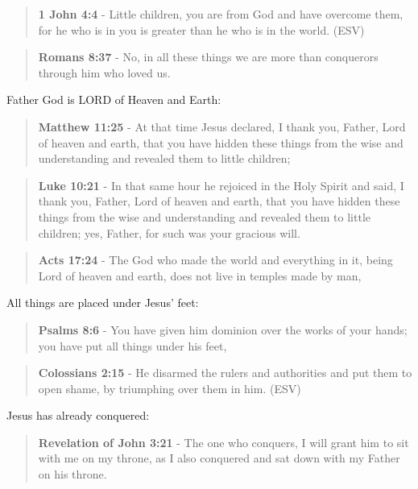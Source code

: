 \documentclass[11pt]{article}
\begin{document}
\begin{quote}
\textbf{1 John 4:4} -  Little children, you are from God and have overcome them, for he who is in you is greater than he who is in the world.  (ESV)
\end{quote}

\begin{quote}
\textbf{Romans 8:37} - No, in all these things we are more than conquerors through him who loved us.
\end{quote}

Father God is LORD of Heaven and Earth:

\begin{quote}
\textbf{Matthew 11:25} - At that time Jesus declared, I thank you, Father, Lord of heaven and earth, that you have hidden these things from the wise and understanding and revealed them to little children;
\end{quote}

\begin{quote}
\textbf{Luke 10:21} - In that same hour he rejoiced in the Holy Spirit and said, I thank you, Father, Lord of heaven and earth, that you have hidden these things from the wise and understanding and revealed them to little children; yes, Father, for such was your gracious will.
\end{quote}

\begin{quote}
\textbf{Acts 17:24} - The God who made the world and everything in it, being Lord of heaven and earth, does not live in temples made by man,
\end{quote}

All things are placed under Jesus' feet:

\begin{quote}
\textbf{Psalms 8:6} - You have given him dominion over the works of your hands; you have put all things under his feet,
\end{quote}

\begin{quote}
\textbf{Colossians 2:15} - He disarmed the rulers and authorities and put them to open shame, by triumphing over them in him.  (ESV)
\end{quote}

Jesus has already conquered:

\begin{quote}
\textbf{Revelation of John 3:21} - The one who conquers, I will grant him to sit with me on my throne, as I also conquered and sat down with my Father on his throne.
\end{quote}
\end{document}
